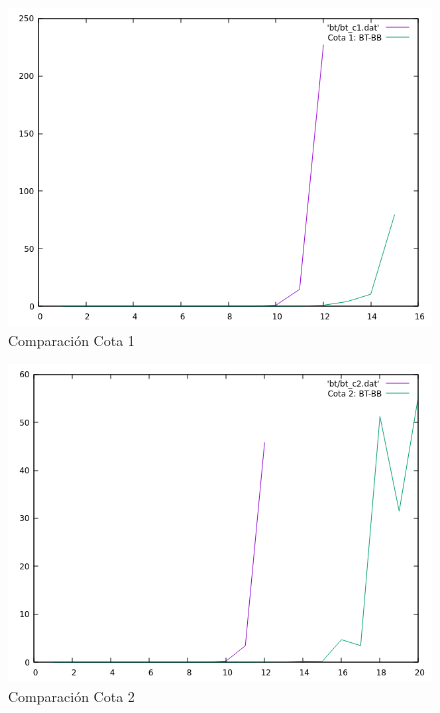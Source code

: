 \documentclass[a4paper,12pt,twoside]{article} %
\begin{document}
\begin{figure}[h]
  \begin{center}
  
  	\includegraphics[scale=0.7]{IMAGENES/bt_bb_c1.png}
  	\caption{Comparación Cota 1}
  	
  \end{center}
\end{figure}
\newpage
\begin{figure}[h]
  \begin{center}
  
  	\includegraphics[scale=0.7]{IMAGENES/bt_bb_c2.png}
  	\caption{Comparación Cota 2}
  	
  \end{center}
\end{figure}
\end{document}
